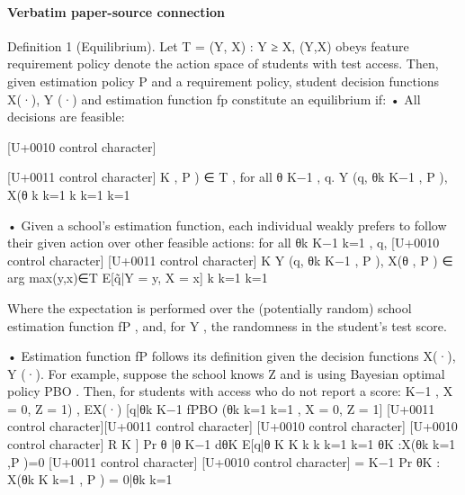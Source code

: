 \documentclass[10pt]{article}
\begin{document}
\paragraph{Verbatim paper-source connection}
\begin{ReviewVerbatim}
Definition 1 (Equilibrium). Let T = {(Y, X) : Y ≥ X, (Y,X) obeys feature requirement policy} denote the action space of students with test access. Then, given estimation policy P and a requirement
policy, student decision functions X(·), Y (·) and estimation function fp constitute an equilibrium if:
• All decisions are feasible:

[U+0010 control character]

[U+0011 control character]
K , P ) ∈ T , for all {θ }K−1 , q.
Y (q, {θk }K−1
,
P
),
X({θ
}
k k=1
k k=1
k=1

• Given a school’s estimation function, each individual weakly prefers to follow their given action
over other feasible actions: for all {θk }K−1
k=1 , q,
[U+0010 control character]
[U+0011 control character]
K
Y (q, {θk }K−1
,
P
),
X({θ
}
,
P
)
∈ arg max(y,x)∈T E[q̃|Y = y, X = x]
k
k=1
k=1

Where the expectation is performed over the (potentially random) school estimation function
fP , and, for Y , the randomness in the student’s test score.

• Estimation function fP follows its definition given the decision functions X(·), Y (·). For
example, suppose the school knows Z and is using Bayesian optimal policy PBO . Then, for
students with access who do not report a score:
K−1
, X = 0, Z = 1) , EX(·) [q|{θk }K−1
fPBO ({θk }k=1
k=1 , X = 0, Z = 1]
[U+0011 control character][U+0011 control character]
[U+0010 control character]
[U+0010 control character]
R
K ] Pr θ |{θ }K−1
dθK
E[q|{θ
}
K
K
k
k
k=1
k=1
θK :X({θk }k=1 ,P )=0
[U+0011 control character]
[U+0010 control character]
=
K−1
Pr {θK : X({θk }K
k=1 , P ) = 0}|{θk }k=1
\end{ReviewVerbatim}
\end{document}
